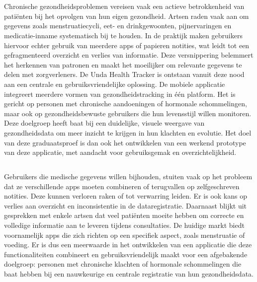 
\chapter{}%
\label{ch:inleiding}

Chronische gezondheidsproblemen vereisen vaak een actieve betrokkenheid van patiënten bij het opvolgen van hun eigen gezondheid. 
Artsen raden vaak aan om gegevens zoals menstruatiecycli, eet- en drinkgewoonten, pijnervaringen en medicatie-inname systematisch bij te houden. 
In de praktijk maken gebruikers hiervoor echter gebruik van meerdere apps of papieren notities, wat leidt tot een gefragmenteerd overzicht en verlies van informatie. 
Deze versnippering belemmert het herkennen van patronen en maakt het moeilijker om relevante gegevens te delen met zorgverleners. 
De Unda Health Tracker is ontstaan vanuit deze nood aan een centrale en gebruiksvriendelijke oplossing. De mobiele applicatie integreert meerdere vormen van gezondheidstracking in één platform. 
Het is gericht op personen met chronische aandoeningen of hormonale schommelingen, maar ook op gezondheidsbewuste gebruikers die hun levensstijl willen monitoren. 
Deze doelgroep heeft baat bij een duidelijke, visuele weergave van gezondheidsdata om meer inzicht te krijgen in hun klachten en evolutie. 
Het doel van deze graduaatsproef is dan ook het ontwikkelen van een werkend prototype van deze applicatie, met aandacht voor gebruiksgemak en overzichtelijkheid. 

\section{}%
\label{sec:probleemstelling}

Gebruikers die medische gegevens willen bijhouden, stuiten vaak op het probleem dat ze verschillende apps 
moeten combineren of terugvallen op zelfgeschreven notities. 
Deze kunnen verloren raken of tot verwarring leiden. 
Er is ook kans op verlies aan overzicht en inconsistentie in de dataregistratie. 
Daarnaast blijkt uit gesprekken met enkele artsen dat veel patiënten moeite hebben om correcte en volledige informatie aan te leveren tijdens consultaties. 
De huidige markt biedt voornamelijk apps die zich richten op een specifiek aspect, zoals menstruatie of voeding. 
Er is dus een meerwaarde in het ontwikkelen van een applicatie die deze functionaliteiten combineert 
en gebruiksvriendelijk maakt voor een afgebakende doelgroep: personen met chronische klachten of hormonale schommelingen die baat hebben bij 
een nauwkeurige en centrale registratie van hun gezondheidsdata. 

